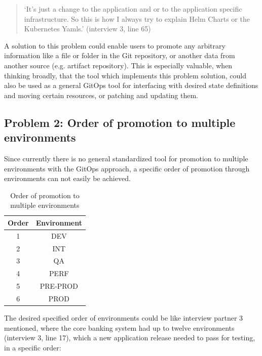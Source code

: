 \begin{quotation}
	\noindent
	\enquote*{It's just a change to the application and or to the application specific infrastructure. So this is how I always try to explain Helm Charts or the Kubernetes Yamls.}
	(interview 3, line 65)
\end{quotation}

A solution to this problem could enable users to promote any arbitrary information
like a file or folder in the Git repository,
or another data from another source (e.g. artifact repository).
This is especially valuable, when thinking broadly, that the tool
which implements this problem solution, could also be used as a general
GitOps tool for interfacing with desired state definitions and moving certain
resources, or patching and updating them.

\subsection{Problem 2: Order of promotion to multiple environments}
\label{problem2}

Since currently there is no general standardized tool for promotion to multiple environments with the GitOps approach,
a specific order of promotion through environments can not easily be achieved.

\begin{table}[h]
	\begin{center}
		\begin{tabular}{||c c||} 
			\hline
			Order & Environment \\ [0.5ex] 
			\hline\hline
			1 & DEV \\ 
			\hline
			2 & INT \\ 
			\hline
			3 & QA \\
			\hline
			4 & PERF \\
			\hline
			5 & PRE-PROD \\
			\hline
			6 & PROD \\
			\hline
		\end{tabular}
		\caption{Order of promotion to multiple environments}
		\label{table:order-promotion-multi-env}
	\end{center}
\end{table}

The desired specified order of environments could be like interview partner 3 mentioned,
where the core banking system had up to twelve environments
(interview 3, line 17),
which a new application release needed to pass for testing,
in a specific order:

